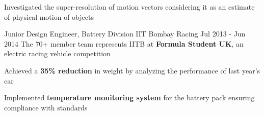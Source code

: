 \begin{cventries}
{\begin{cvitems}
        \item {Investigated the super-resolution of motion vectors considering it as an estimate of physical motion of objects}
    \end{cvitems}
}
\cventrylong
{Junior Design Engineer, Battery Division} %
{IIT Bombay Racing} %
{Jul 2013 - Jun 2014} %
{The 70+ member team represents IITB at \textbf{Formula Student UK}, an electric racing vehicle competition} %
{ %
    \begin{cvitems}
        \item {Achieved a \textbf{35\% reduction} in weight by analyzing the performance of last year's car}
        \item {Implemented \textbf{temperature monitoring system} for the battery pack ensuring compliance with standards}
    \end{cvitems}
}
\end{cventries}